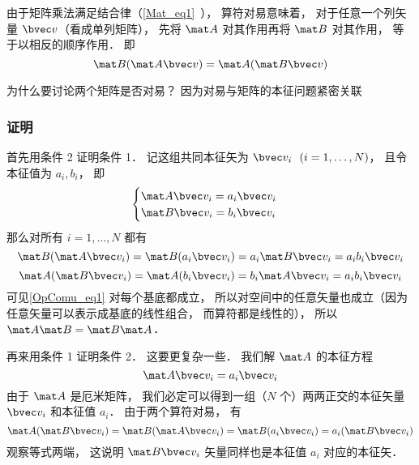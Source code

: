 
\begin{issues}
\end{issues}

由于矩阵乘法满足结合律（\autoref{Mat_eq1}~）， 算符对易意味着， 对于任意一个列矢量 $\bvec v$（看成单列矩阵）， 先将 $\mat A$ 对其作用再将 $\mat B$ 对其作用， 等于以相反的顺序作用． 即
\begin{equation}\label{OpComu_eq1}
\mat B(\mat A \bvec v) = \mat A (\mat B \bvec v)
\end{equation}

为什么要讨论两个矩阵是否对易？ 因为对易与矩阵的本征问题紧密关联



\subsubsection{证明}
首先用条件 2 证明条件 1． 记这组共同本征矢为 $\bvec v_i \ \ (i = 1, \dots , N)$， 且令本征值为 $a_i, b_i$， 即
\begin{equation}
\begin{cases}
\mat A \bvec v_i = a_i \bvec v_i\\
\mat B \bvec v_i = b_i \bvec v_i
\end{cases}
\end{equation}
那么对所有 $i = 1, \dots, N$ 都有
\begin{equation}
\mat B (\mat A \bvec v_i) = \mat B (a_i \bvec v_i) = a_i \mat B \bvec v_i = a_i b_i \bvec v_i
\end{equation}
\begin{equation}
\mat A (\mat B \bvec v_i) = \mat A (b_i \bvec v_i) = b_i \mat A \bvec v_i = a_i b_i \bvec v_i
\end{equation}
可见\autoref{OpComu_eq1} 对每个基底都成立， 所以对空间中的任意矢量也成立（因为任意矢量可以表示成基底的线性组合， 而算符都是线性的）， 所以 $\mat A \mat B = \mat B \mat A$．

再来用条件 1 证明条件 2． 这要更复杂一些． 我们解 $\mat A$ 的本征方程
\begin{equation}\label{OpComu_eq2}
\mat A \bvec v_i = a_i \bvec v_i
\end{equation}
由于 $\mat A$ 是厄米矩阵， 我们必定可以得到一组（$N$ 个）两两正交的本征矢量 $\bvec v_i$ 和本征值 $a_i$． 由于两个算符对易， 有
\begin{equation}\label{OpComu_eq3}
\mat A (\mat B \bvec v_i) = \mat B (\mat A \bvec v_i) = \mat B (a_i \bvec v_i) = a_i (\mat B \bvec v_i)
\end{equation}
观察等式两端， 这说明 $\mat B \bvec v_i$ 矢量同样也是本征值 $a_i$ 对应的本征矢．

